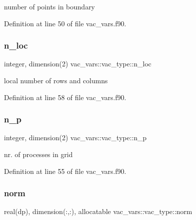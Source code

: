 number of points in boundary 



Definition at line 50 of file vac\+\_\+vars.\+f90.

\mbox{\label{structvac__vars_1_1vac__type_ad773e9aa724066256c3955a1a98a1d63}} 
\subsubsection{\texorpdfstring{n\+\_\+loc}{n\_loc}}
{\footnotesize\ttfamily integer, dimension(2) vac\+\_\+vars\+::vac\+\_\+type\+::n\+\_\+loc}



local number of rows and columns 



Definition at line 58 of file vac\+\_\+vars.\+f90.

\mbox{\label{structvac__vars_1_1vac__type_aaf6def83c79ec72152b8aa27081fde11}} 
\subsubsection{\texorpdfstring{n\+\_\+p}{n\_p}}
{\footnotesize\ttfamily integer, dimension(2) vac\+\_\+vars\+::vac\+\_\+type\+::n\+\_\+p}



nr. of processes in grid 



Definition at line 55 of file vac\+\_\+vars.\+f90.

\mbox{\label{structvac__vars_1_1vac__type_a0a50780974a5360abbc019e2e32f82ec}} 
\subsubsection{\texorpdfstring{norm}{norm}}
{\footnotesize\ttfamily real(dp), dimension(\+:,\+:), allocatable vac\+\_\+vars\+::vac\+\_\+type\+::norm}




